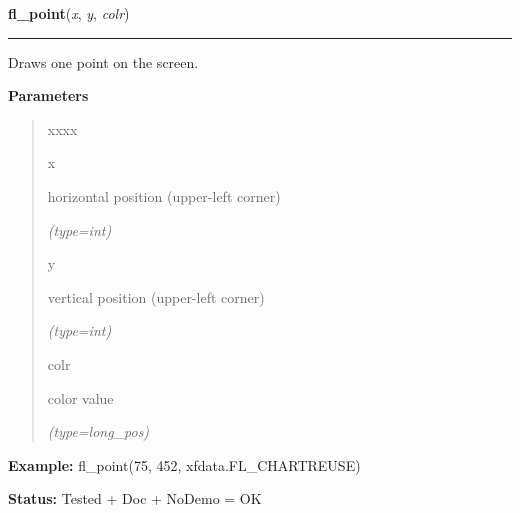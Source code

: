     \label{xformslib:flxbasic:fl_point}

    \vspace{0.5ex}

\hspace{.8\funcindent}\begin{boxedminipage}{\funcwidth}

    \raggedright \textbf{fl\_point}(\textit{x}, \textit{y}, \textit{colr})

    \vspace{-1.5ex}

    \rule{\textwidth}{0.5\fboxrule}
\setlength{\parskip}{2ex}
    Draws one point on the screen.

\setlength{\parskip}{1ex}
      \textbf{Parameters}
      \vspace{-1ex}

      \begin{quote}
        \begin{Ventry}{xxxx}

          \item[x]

          horizontal position (upper-left corner)

            {\it (type=int)}

          \item[y]

          vertical position (upper-left corner)

            {\it (type=int)}

          \item[colr]

          color value

            {\it (type=long\_pos)}

        \end{Ventry}

      \end{quote}

\textbf{Example:} fl\_point(75, 452, xfdata.FL\_CHARTREUSE)



\textbf{Status:} Tested + Doc + NoDemo = OK



    \end{boxedminipage}

    \label{xformslib:flxbasic:fl_points}

